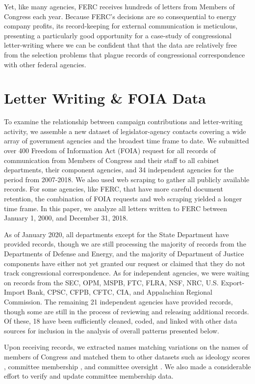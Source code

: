 \documentclass{article}
\begin{document}
Yet, like many agencies, FERC receives hundreds of letters from Members of Congress each year. Because FERC's decisions are so consequential to energy company profits, its record-keeping for external communication is meticulous, presenting a particularly good opportunity for a  case-study of congressional letter-writing where we can be confident that that the data are relatively free from the selection problems that plague records of congressional correspondence with other federal agencies. 

\section{Letter Writing \& FOIA Data}

To examine the relationship between campaign contributions and letter-writing activity, we assemble a new dataset of legislator-agency contacts covering a wide array of government agencies and the broadest time frame to date. We submitted over 400 Freedom of Information Act (FOIA) request for all records of communication from Members of Congress and their staff to all cabinet departments, their component agencies, and 34 independent agencies for the period from 2007-2018. We also used web scraping to gather all publicly available records. For some agencies, like FERC, that have more careful document retention, the combination of FOIA requests and web scraping yielded a longer time frame. In this paper, we analyze all letters written to FERC between January 1, 2000, and December 31, 2018.

As of January 2020, all departments except for the State Department have provided records, though we are still processing the majority of records from the Departments of Defense and Energy, and the majority of Department of Justice components have either not yet granted our request or claimed that they do not track congressional correspondence. As for independent agencies, we were waiting on records from the SEC, OPM, MSPB, FTC, FLRA, NSF, NRC, U.S. Export-Import Bank, CPSC, CFPB, CFTC, CIA, and Appalachian Regional Commission. The remaining 21 independent agencies have provided records, though some are still in the process of reviewing and releasing additional records. Of these, 18 have been sufficiently cleaned, coded, and linked with other data sources for inclusion in the analysis of overall patterns presented below. 

Upon receiving records, we extracted names matching variations on the names of members of Congress and matched them to other datasets such as ideology scores \citep{dwnominate2018}, committee membership \citep{StewartWoon2017}, and committee oversight \citep{LewisSelin2012}. We also made a considerable effort to verify and update committee membership data. 
\end{document}
